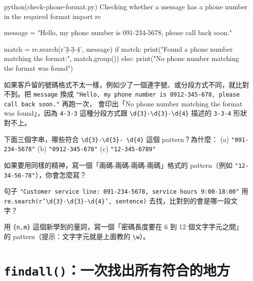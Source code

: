 \begin{example}{python}{(check-phone-format.py) Checking whether a message has a phone number in the required format}
import re

message = "Hello, my phone number is 091-234-5678, please call back soon."

match = re.search(r'\d{3}-\d{3}-\d{4}', message)
if match:
    print("Found a phone number matching the format:", match.group())
else:
    print("No phone number matching the format was found")
\end{example}


如果客戶留的號碼格式不太一樣，例如少了一個連字號、或分段方式不同，就比對不到。把
\texttt{message} 換成 \texttt{"Hello, my phone number is 0912-345-678, please call back soon."} 再跑一次，
會印出「No phone number matching the format was found」，因為 \texttt{4-3-3} 這種分段方式跟
\texttt{\textbackslash d\{3\}-\textbackslash d\{3\}-\textbackslash d\{4\}} 描述的
\texttt{3-3-4} 形狀對不上。


\begin{drills}[label=drills:regex-patterns]
\item 下面三個字串，哪些符合 \texttt{\textbackslash d\{3\}-\textbackslash d\{3\}-%
\textbackslash d\{4\}} 這個 pattern？為什麼：
(a) \texttt{"091-234-5678"}
(b) \texttt{"0912-345-678"}
(c) \texttt{"12-345-6789"}
\item 如果要用同樣的精神，寫一個「兩碼-兩碼-兩碼-兩碼」格式的 pattern（例如
\texttt{"12-34-56-78"}），你會怎麼寫？
\item 句子 \texttt{"Customer service line: 091-234-5678, service hours 9:00-18:00"} 用
\texttt{re.search(r'\textbackslash d\{3\}-\textbackslash d\{3\}-\textbackslash d\{4\}',
sentence)} 去找，比對到的會是哪一段文字？
\item 用 \texttt{\{n,m\}} 這個新學到的量詞，寫一個「密碼長度要在 6 到 12 個文字字元之間」
的 pattern（提示：文字字元就是上面教的 \texttt{\textbackslash w}）。
\end{drills}

\section{\texttt{findall()}：一次找出所有符合的地方}
\label{sec:regex-findall}

